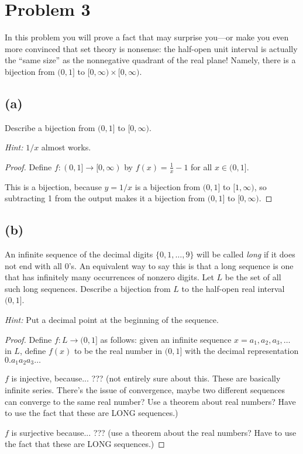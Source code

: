 \documentclass[14pt]{extarticle}
\begin{document}
\section{Problem 3}
In this problem you will prove a fact that may surprise you—or make you even more convinced that set theory is nonsense: the half-open unit interval is actually the “same size” as the nonnegative quadrant of the
real plane! Namely, there is a bijection from $(0, 1]$ to $[0, \infty) \times [0, \infty)$.

\subsection{(a)}
Describe a bijection from $(0, 1]$ to $[0, \infty)$.

\textit{Hint:} $1/x$ almost works.

\begin{proof}
Define $f: (0, 1] \to [0, \infty)$ by $\displaystyle f(x) = \frac{1}{x} - 1$ for all $x \in (0,1]$. 

This is a bijection, because $y = 1/x$ is a bijection from $(0,1]$ to $[1, \infty)$, so subtracting 1 from the output makes it a bijection from $(0,1]$ to $[0, \infty)$.
\end{proof}

\subsection{(b)}
An infinite sequence of the decimal digits $\{0, 1, \ldots , 9\}$ will be called \textit{long} if it does not end with all 0’s. An equivalent way to say this is that a long sequence is one that has infinitely many occurrences of nonzero digits. Let $L$ be the set of all such long sequences. Describe a bijection from $L$ to the half-open real interval $(0, 1]$.

\textit{Hint:} Put a decimal point at the beginning of the sequence.

\begin{proof}
Define $f: L \to (0, 1]$ as follows: given an infinite sequence $x = a_1, a_2, a_3, \ldots$ in $L$, define $f(x)$ to be the real number in $(0, 1]$ with the decimal representation $0.a_1a_2a_3\ldots$

$f$ is injective, because... ??? (not entirely sure about this. These are basically infinite series. There's the issue of convergence, maybe two different sequences can converge to the same real number? Use a theorem about real numbers? Have to use the fact that these are LONG sequences.)

$f$ is surjective because... ??? (use a theorem about the real numbers? Have to use the fact that these are LONG sequences.)
\end{proof}
\end{document}
